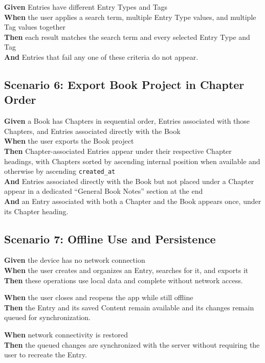 \documentclass[11pt,a4paper]{article}
\begin{document}
\textbf{Given} Entries have different Entry Types and Tags\\
\textbf{When} the user applies a search term, multiple Entry Type values, and multiple Tag values together\\
\textbf{Then} each result matches the search term and every selected Entry Type and Tag\\
\textbf{And} Entries that fail any one of these criteria do not appear.

\subsection*{Scenario 6: Export Book Project in Chapter Order}
\textbf{Given} a Book has Chapters in sequential order, Entries associated with those Chapters, and Entries associated directly with the Book\\
\textbf{When} the user exports the Book project\\
\textbf{Then} Chapter-associated Entries appear under their respective Chapter headings, with Chapters sorted by ascending internal position when available and otherwise by ascending \texttt{created\_at}\\
\textbf{And} Entries associated directly with the Book but not placed under a Chapter appear in a dedicated ``General Book Notes'' section at the end\\
\textbf{And} an Entry associated with both a Chapter and the Book appears once, under its Chapter heading.

\subsection*{Scenario 7: Offline Use and Persistence}
\textbf{Given} the device has no network connection\\
\textbf{When} the user creates and organizes an Entry, searches for it, and exports it\\
\textbf{Then} these operations use local data and complete without network access.

\textbf{When} the user closes and reopens the app while still offline\\
\textbf{Then} the Entry and its saved Content remain available and its changes remain queued for synchronization.

\textbf{When} network connectivity is restored\\
\textbf{Then} the queued changes are synchronized with the server without requiring the user to recreate the Entry.
\end{document}
